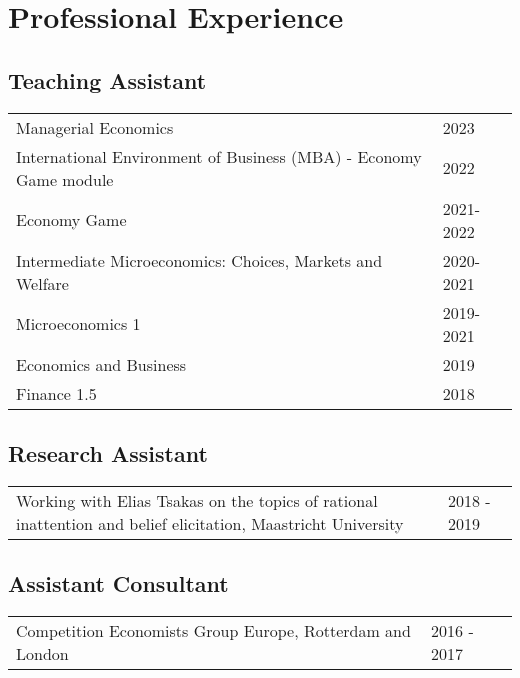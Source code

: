 \documentclass[11pt]{article}
\begin{document}
\section{Professional Experience}

\subsection{Teaching Assistant}

\noindent\begin{tabular}{L{14cm}L{3cm}}
    \rule{0pt}{4ex}Managerial Economics & 2023 \\
	\rule{0pt}{2ex}International Environment of Business (MBA) - Economy Game module & 2022 \\
	\rule{0pt}{2ex}Economy Game & 2021-2022 \\
    \rule{0pt}{2ex}Intermediate Microeconomics: Choices, Markets and Welfare & 2020-2021 \\
	\rule{0pt}{2ex}Microeconomics 1 & 2019-2021 \\
	\rule{0pt}{2ex}Economics and Business & 2019 \\
	\rule{0pt}{2ex}Finance 1.5 & 2018 \\
\end{tabular}


\subsection{Research Assistant}

\noindent\begin{tabular}{L{14cm}L{3cm}}
	\rule{0pt}{4ex}Working with Elias Tsakas on the topics of rational inattention and belief elicitation, Maastricht University & 2018 - 2019 
\end{tabular}


\subsection{Assistant Consultant}

\noindent\begin{tabular}{L{14cm}L{3cm}}
	\rule{0pt}{4ex}Competition Economists Group Europe, Rotterdam and London & 2016 - 2017
\end{tabular}
\end{document}
